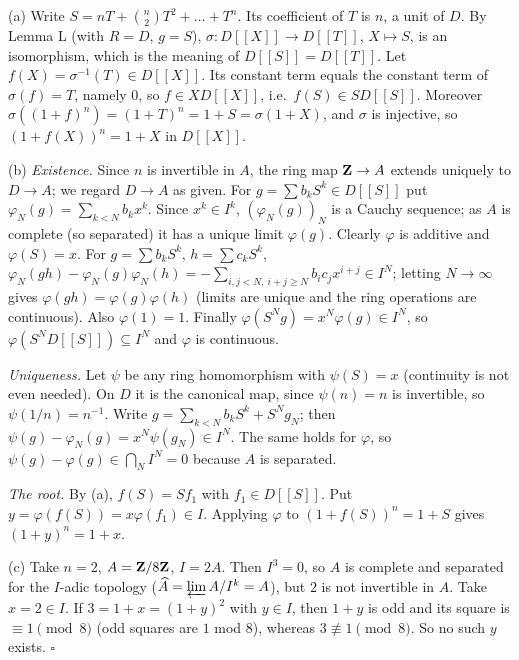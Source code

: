 \documentclass[11pt]{article}
\begin{document}
(a) Write $S=nT+\binom n2T^2+\dots+T^n$. Its coefficient of $T$ is $n$, a unit of $D$. By Lemma L (with $R=D$, $g=S$), $\sigma:D[[X]]\to D[[T]]$, $X\mapsto S$, is an isomorphism, which is the meaning of $D[[S]]=D[[T]]$. Let $f(X)=\sigma^{-1}(T)\in D[[X]]$. Its constant term equals the constant term of $\sigma(f)=T$, namely $0$, so $f\in XD[[X]]$, i.e.\ $f(S)\in SD[[S]]$. Moreover $\sigma((1+f)^n)=(1+T)^n=1+S=\sigma(1+X)$, and $\sigma$ is injective, so $(1+f(X))^n=1+X$ in $D[[X]]$.

(b) \emph{Existence.} Since $n$ is invertible in $A$, the ring map $\mathbf Z\to A$ extends uniquely to $D\to A$; we regard $D\to A$ as given. For $g=\sum b_kS^k\in D[[S]]$ put $\varphi_N(g)=\sum_{k<N}b_kx^k$. Since $x^k\in I^k$, $(\varphi_N(g))_N$ is a Cauchy sequence; as $A$ is complete (so separated) it has a unique limit $\varphi(g)$. Clearly $\varphi$ is additive and $\varphi(S)=x$. For $g=\sum b_kS^k$, $h=\sum c_kS^k$, $\varphi_N(gh)-\varphi_N(g)\varphi_N(h)=-\sum_{i,j<N,\ i+j\ge N}b_ic_jx^{i+j}\in I^N$; letting $N\to\infty$ gives $\varphi(gh)=\varphi(g)\varphi(h)$ (limits are unique and the ring operations are continuous). Also $\varphi(1)=1$. Finally $\varphi(S^Ng)=x^N\varphi(g)\in I^N$, so $\varphi(S^ND[[S]])\subseteq I^N$ and $\varphi$ is continuous.

\emph{Uniqueness.} Let $\psi$ be any ring homomorphism with $\psi(S)=x$ (continuity is not even needed). On $D$ it is the canonical map, since $\psi(n)=n$ is invertible, so $\psi(1/n)=n^{-1}$. Write $g=\sum_{k<N}b_kS^k+S^Ng_N$; then $\psi(g)-\varphi_N(g)=x^N\psi(g_N)\in I^N$. The same holds for $\varphi$, so $\psi(g)-\varphi(g)\in\bigcap_NI^N=0$ because $A$ is separated.

\emph{The root.} By (a), $f(S)=Sf_1$ with $f_1\in D[[S]]$. Put $y=\varphi(f(S))=x\varphi(f_1)\in I$. Applying $\varphi$ to $(1+f(S))^n=1+S$ gives $(1+y)^n=1+x$.

(c) Take $n=2$, $A=\mathbf Z/8\mathbf Z$, $I=2A$. Then $I^3=0$, so $A$ is complete and separated for the $I$-adic topology ($\widehat{A}=\varprojlim A/I^k=A$), but $2$ is not invertible in $A$. Take $x=2\in I$. If $3=1+x=(1+y)^2$ with $y\in I$, then $1+y$ is odd and its square is $\equiv1\pmod 8$ (odd squares are $1$ mod $8$), whereas $3\not\equiv1\pmod8$. So no such $y$ exists. \hfill$\square$
\end{document}

